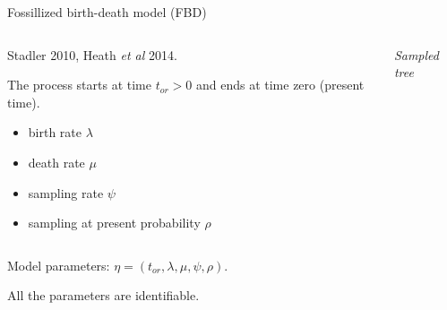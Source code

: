 

\begin{frame} {Fossillized birth-death model (FBD)}


\begin{columns}[t]
\begin{column}{.5\textwidth}

Stadler 2010, Heath {\it et al} 2014. 
\vspace{0.2cm}

The process starts at time $t_{or}>0$ and ends at time zero (present time).  
  \vspace{0.01cm}
   \begin{itemize}
\item birth rate $\lambda$
\item death rate $\mu$
\item sampling rate $\psi$
\item sampling at present probability $\rho$ 
   \end{itemize}
\vspace{0.01cm}

   \end{column}
   \begin{column}{.5\textwidth}

            \begin{center}
               
            \end{center}
         
         \begin{center}\emph{Sampled tree} \end{center}   

   \end{column}    
\end{columns}

\vspace{0.2cm}

Model parameters: \color{newblue1} $\eta = (t_{or}, \lambda, \mu, \psi, \rho)$.

\color{black}
All the parameters are identifiable. 

\vspace{1.5cm}


\end{frame}




